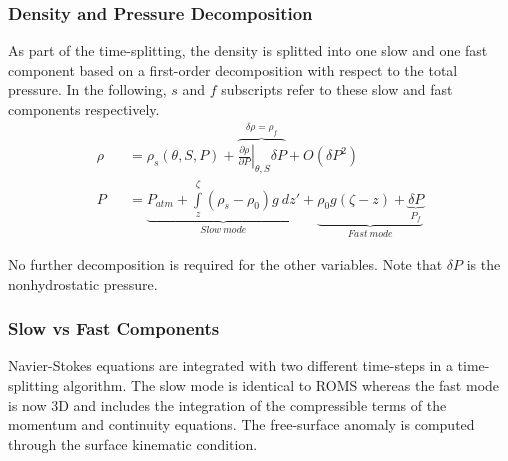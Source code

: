  \subsubsection{Density and Pressure Decomposition}
\indent As part of the time-splitting, the density is splitted into one slow and one fast component based on a first-order decomposition with respect to the total pressure. In the following, $s$ and $f$ subscripts refer to these slow and fast components respectively.\\
\begin{eqnarray}
  \rho &&=\rho_{s}\left(\theta,S,P\right)
  +\overbrace{\left.{\frac{\partial{\rho}}{\partial{P}}}\right|_{\theta,S}\delta{P}}^{\delta{\rho}=\rho_{f}}
  +O\left(\delta{P}^2\right)\\
  P &&=\underbrace{P_{atm}
  +\int\limits_z^{\zeta}{(\rho_{s}-\rho_0)g\ dz'}}_{Slow\ mode}
  +\underbrace{\rho_{0}g(\zeta-z)+\underbrace{\delta P}_{P_{f}}}_{Fast\ mode}
\end{eqnarray}
  
No further decomposition is required for the other variables. Note that $\delta P$ is the nonhydrostatic pressure.
 
 \subsubsection{Slow vs Fast Components}
\indent Navier-Stokes equations are integrated with two different time-steps in a time-splitting algorithm. The slow mode is identical to ROMS whereas the fast mode is now 3D and includes the integration of the compressible terms of the momentum and continuity equations. The free-surface anomaly is computed through the surface kinematic condition.
  
